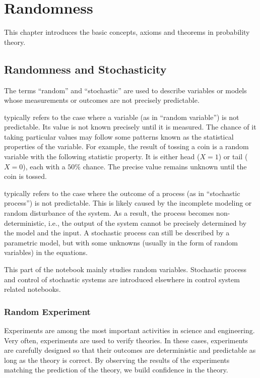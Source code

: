 \chapter{Randomness} \label{ch:pbbasics}

This chapter introduces the basic concepts, axioms and theorems in probability theory.

\section{Randomness and Stochasticity}

The terms ``random'' and ``stochastic'' are used to describe variables or models whose measurements or outcomes are not precisely predictable.

 typically refers to the case where a variable (as in ``random variable'') is not predictable. Its value is not known precisely until it is measured. The chance of it taking particular values may follow some patterns known as the statistical properties of the variable. For example, the result of tossing a coin is a random variable with the following statistic property. It is either head ($X=1$) or tail ($X=0$), each with a $50\%$ chance. The precise value remains unknown until the coin is tossed.

 typically refers to the case where the outcome of a process (as in ``stochastic process'') is not predictable. This is likely caused by the incomplete modeling or random disturbance of the system. As a result, the process becomes non-deterministic, i.e., the output of the system cannot be precisely determined by the model and the input. A stochastic process can still be described by a parametric model, but with some unknowns (usually in the form of random variables) in the equations.

This part of the notebook mainly studies random variables. Stochastic process and control of stochastic systems are introduced elsewhere in control system related notebooks.

\subsection{Random Experiment}

Experiments are among the most important activities in science and engineering. Very often, experiments are used to verify theories. In these cases, experiments are carefully designed so that their outcomes are deterministic and predictable as long as the theory is correct. By observing the results of the experiments matching the prediction of the theory, we build confidence in the theory.

